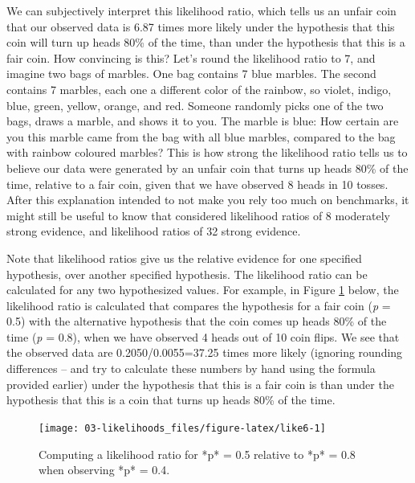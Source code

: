 \documentclass[
  oneside]{book}
\begin{document}
We can subjectively interpret this likelihood ratio, which tells us an unfair coin that our observed data is 6.87 times more likely under the hypothesis that this coin will turn up heads 80\% of the time, than under the hypothesis that this is a fair coin. How convincing is this? Let's round the likelihood ratio to 7, and imagine two bags of marbles. One bag contains 7 blue marbles. The second contains 7 marbles, each one a different color of the rainbow, so violet, indigo, blue, green, yellow, orange, and red. Someone randomly picks one of the two bags, draws a marble, and shows it to you. The marble is blue: How certain are you this marble came from the bag with all blue marbles, compared to the bag with rainbow coloured marbles? This is how strong the likelihood ratio tells us to believe our data were generated by an unfair coin that turns up heads 80\% of the time, relative to a fair coin, given that we have observed 8 heads in 10 tosses. After this explanation intended to not make you rely too much on benchmarks, it might still be useful to know that \citet{royall_statistical_1997} considered likelihood ratios of 8 moderately strong evidence, and likelihood ratios of 32 strong evidence.

Note that likelihood ratios give us the relative evidence for one specified hypothesis, over another specified hypothesis. The likelihood ratio can be calculated for any two hypothesized values. For example, in Figure \ref{fig:like6} below, the likelihood ratio is calculated that compares the hypothesis for a fair coin (\emph{p} = 0.5) with the alternative hypothesis that the coin comes up heads 80\% of the time (\emph{p} = 0.8), when we have observed 4 heads out of 10 coin flips. We see that the observed data are 0.2050/0.0055=37.25 times more likely (ignoring rounding differences -- and try to calculate these numbers by hand using the formula provided earlier) under the hypothesis that this is a fair coin is than under the hypothesis that this is a coin that turns up heads 80\% of the time.

\begin{figure}

{\centering \texttt{[image: 03-likelihoods\_files/figure-latex/like6-1]} 

}

\caption{Computing a likelihood ratio for *p* = 0.5 relative to *p* = 0.8 when observing *p* = 0.4.}\label{fig:like6}
\end{figure}
\end{document}
